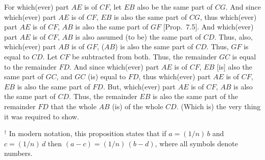 \begin{Parallel}{}{}
{For which(ever) part $AE$ is of $CF$, let $EB$ also be the same part of $CG$.
And since which(ever) part $AE$ is of $CF$, $EB$ is also the same part
of $CG$, thus which(ever) part $AE$ is of $CF$, $AB$ is also the same part of
$GF$ [Prop.~7.5]. And which(ever) part $AE$ is of $CF$, $AB$ is also assumed (to be)
the same part of $CD$. Thus, also, which(ever) part $AB$ is of $GF$, ($AB$) is also
the same part of $CD$. Thus, $GF$ is equal to $CD$. Let $CF$ be subtracted from
both. Thus, the remainder $GC$ is equal to the remainder $FD$. And since
which(ever) part $AE$ is of $CF$, $EB$ [is] also the same part of $GC$, and $GC$ (is)
equal to $FD$, thus which(ever) part $AE$ is of $CF$, $EB$ is also the same part of
$FD$.
 But, 
which(ever) part $AE$ is of $CF$, $AB$ is also the same part of $CD$. Thus, the
remainder $EB$ is also the same part of the remainder $FD$ that
the whole $AB$ (is) of the whole $CD$. (Which is) the very thing it
was required to show.}
\end{Parallel}
{\footnotesize \noindent$^\dag$ In modern notation, this
proposition states that if $a=(1/n)\,b$ and $c=(1/n)\,d$ then $(a-c)=
(1/n)\,(b-d)$, where all symbols denote numbers.}

